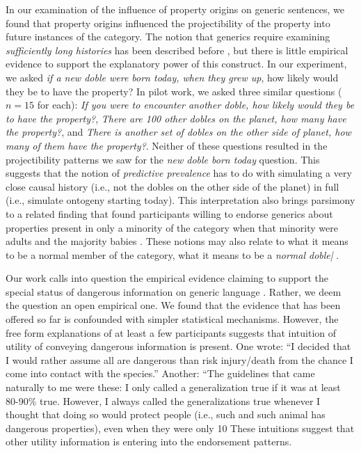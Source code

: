 \documentclass[floatsintext, 11pt, doc]{apa6}
\begin{document}
In our examination of the influence of property origins on generic sentences, we found that property origins influenced the projectibility of the property into future instances of the category. 
The notion that generics require examining \emph{sufficiently long histories} has been described before \cite{Cohen1999}, but there is little empirical evidence to support the explanatory power of this construct. 
In our experiment, we asked \emph{if a new doble were born today, when they grew up}, how likely would they be to have the property?
In pilot work, we asked three similar questions ($n=15$ for each): \emph{If you were to encounter another doble, how likely would they be to have the property?}, \emph{There are 100 other dobles on the planet, how many have the property?}, and \emph{There is another set of dobles on the other side of planet, how many of them have the property?}.
Neither of these questions resulted in the projectibility patterns we saw for the \emph{new doble born today} question. 
This suggests that the notion of \emph{predictive prevalence} has to do with simulating a very close causal history (i.e., not the dobles on the other side of the planet) in full (i.e., simulate ontogeny starting today). 
This interpretation also brings parsimony to a related finding that found participants willing to endorse generics about properties present in only a minority of the category when that minority were adults and the majority babies \cite{Cimpian2010theory}.
These notions may also relate to what it means to be a normal member of the category, what it means to be a \emph{normal doble|} \cite{Nickel2008}.

Our work calls into question the empirical evidence claiming to support the special status of dangerous information on generic language \cite{Leslie2008, Cimpian2010}.
Rather, we deem the question an open empirical one. 
We found that the evidence that has been offered so far is confounded with simpler statistical mechanisms. 
However, the free form explanations of at least a few participants suggests that intuition of utility of conveying dangerous information is present. 
One wrote: ``I decided that I would rather assume all are dangerous than risk injury/death from the chance I come into contact with the species.''
Another: ``The guidelines that came naturally to me were these: I only called a generalization true if it was at least 80-90\% true. However, I always called the generalizations true whenever I thought that doing so would protect people (i.e., such and such animal has dangerous properties), even when they were only 10%
These intuitions suggest that other utility information is entering into the endorsement patterns. 
\end{document}
